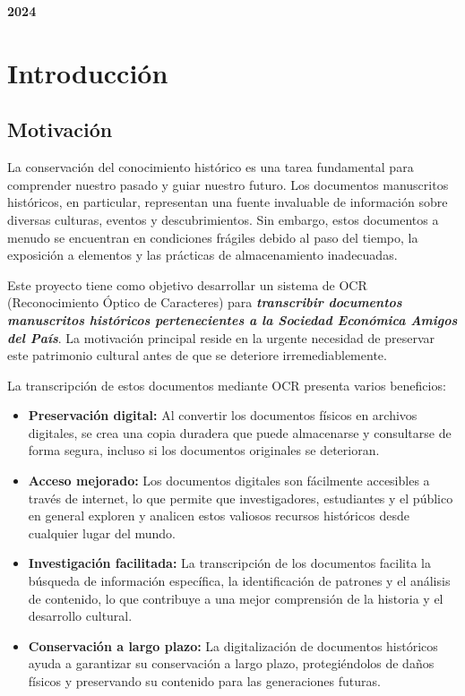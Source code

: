 \documentclass{article}
\begin{document}
\vspace{1 cm}

\begin{center}
    \large \bf 2024
\end{center}

\thispagestyle{empty}

\setcounter{page}{0}

\newpage
\tableofcontents

\newpage
\section{Introducción}
\subsection{Motivación}

La conservación del conocimiento histórico es una tarea fundamental para comprender nuestro pasado y guiar nuestro futuro. Los documentos manuscritos históricos, en particular, representan una fuente invaluable de información sobre diversas culturas, eventos y descubrimientos. Sin embargo, estos documentos a menudo se encuentran en condiciones frágiles debido al paso del tiempo, la exposición a elementos y las prácticas de almacenamiento inadecuadas. 

Este proyecto tiene como objetivo desarrollar un sistema de OCR (Reconocimiento Óptico de Caracteres) para \emph{\textbf{transcribir documentos manuscritos históricos pertenecientes a la Sociedad Económica Amigos del País}}. La motivación principal reside en la urgente necesidad de preservar este patrimonio cultural antes de que se deteriore irremediablemente. 

La transcripción de estos documentos mediante OCR presenta varios beneficios:

\begin{itemize}
    \item \textbf{Preservación digital:} Al convertir los documentos físicos en archivos digitales, se crea una copia duradera que puede almacenarse y consultarse de forma segura, incluso si los documentos originales se deterioran.
    \item \textbf{Acceso mejorado:}  Los documentos digitales son fácilmente accesibles a través de internet, lo que permite que investigadores, estudiantes y el público en general exploren y analicen estos valiosos recursos históricos desde cualquier lugar del mundo.
    \item \textbf{Investigación facilitada:} La transcripción de los documentos facilita la búsqueda de información específica, la identificación de patrones y el análisis de contenido, lo que contribuye a una mejor comprensión de la historia y el desarrollo cultural.
    \item \textbf{Conservación a largo plazo:} La digitalización de documentos históricos ayuda a garantizar su conservación a largo plazo, protegiéndolos de daños físicos y preservando su contenido para las generaciones futuras.
\end{itemize}
    
\end{document}
